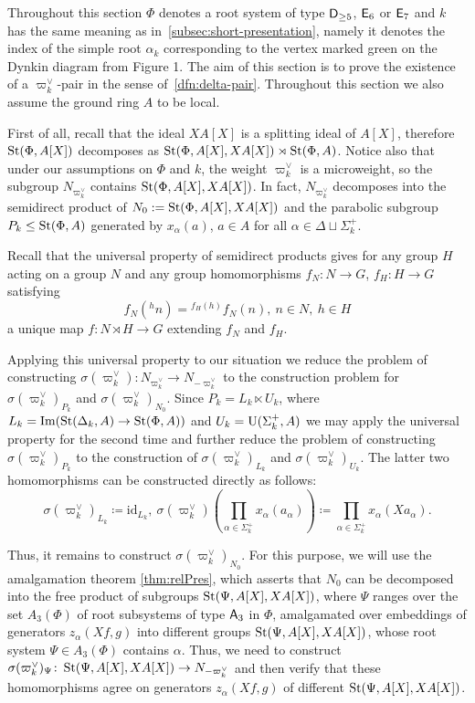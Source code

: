 Throughout this section $\Phi$ denotes a root system of type $\mathsf{D}_{\geq 5}$, $\mathsf{E}_6$ or $\mathsf{E}_7$ and
 $k$ has the same meaning as in~\cref{subsec:short-presentation}, namely
 it denotes the index of the simple root $\alpha_k$ corresponding to the vertex marked green on the Dynkin diagram from Figure 1.
The aim of this section is to prove the existence of a $\varpi_k^\vee$-pair in the sense of~\cref{dfn:delta-pair}.
Throughout this section we also assume the ground ring $A$ to be local.

First of all, recall that the ideal $XA[X]$ is a splitting ideal of $A[X]$, therefore
 $\operatorname{St}(\Phi, A[X])$ decomposes as $\operatorname{St}(\Phi, A[X], XA[X]) \rtimes \operatorname{St}(\Phi, A)$.
Notice also that under our assumptions on $\Phi$ and $k$, the weight $\varpi_k^\vee$ is a microweight, so the subgroup $N_{\varpi_k^\vee}$ contains $\operatorname{St}(\Phi, A[X], XA[X])$.
In fact, $N_{\varpi_k^\vee}$ decomposes into the semidirect product of $N_0 := \operatorname{St}(\Phi, A[X], XA[X])$ and the parabolic subgroup $P_k \leq \operatorname{St}(\Phi, A)$
 generated by $x_\alpha(a)$, $a \in A$ for all $\alpha \in \Delta \sqcup \Sigma^+_k$.

Recall that the universal property of semidirect products gives for any group $H$ acting on a group $N$
 and any group homomorphisms $f_N\colon N \to G$, $f_H\colon H \to G$ satisfying
\begin{equation}
    \label{eq:coherence-condition} f_N({}^hn) = {}^{f_H(h)} f_N(n),\ n\in N,\ h\in H
\end{equation}
a unique map $f\colon N \rtimes H \to G$ extending $f_N$ and $f_H$.

Applying this universal property to our situation we reduce the problem of constructing $\sigma(\varpi_k^\vee) \colon N_{\varpi_k^\vee} \to N_{-\varpi_k^\vee}$
 to the construction problem for $\sigma(\varpi_k^\vee)_{P_k}$ and $\sigma(\varpi_k^\vee)_{N_0}$.
Since $P_k = L_k \ltimes U_k$, where $L_k = \mathrm{Im}(\operatorname{St}(\Delta_k, A) \to \operatorname{St}(\Phi, A))$
and $U_k = \operatorname{U}(\Sigma_k^+, A)$ we may apply the universal property for the second time and further reduce the problem of constructing $\sigma(\varpi_k^\vee)_{P_k}$
 to the construction of $\sigma(\varpi_k^\vee)_{L_k}$ and $\sigma(\varpi_k^\vee)_{U_k}$.
The latter two homomorphisms can be constructed directly as follows:
\[\sigma(\varpi_k^\vee)_{L_k} \coloneqq \mathrm{id}_{L_k},\ \sigma(\varpi_k^\vee)\left(\prod\limits_{\alpha \in \Sigma_k^+} x_\alpha(a_\alpha)\right) \coloneqq \prod\limits_{\alpha \in \Sigma_k^+} x_\alpha(Xa_\alpha).\]

Thus, it remains to construct $\sigma({\varpi_k^\vee})_{N_0}$.
For this purpose, we will use the amalgamation theorem \cref{thm:relPres}, which asserts that $N_0$ can be decomposed into the free product of subgroups $\operatorname{St}(\Psi, A[X], XA[X])$,
 where $\Psi$ ranges over the set $A_3(\Phi)$ of root subsystems of type $\mathsf{A}_3$ in $\Phi$, amalgamated over embeddings of generators $z_\alpha(Xf, g)$ into different groups $\operatorname{St}(\Psi, A[X], XA[X])$, whose root system $\Psi \in A_3(\Phi)$ contains $\alpha$.
Thus, we need to construct $\sigma(\varpi_k^\vee)_\Psi \colon \operatorname{St}(\Psi, A[X], XA[X]) \to N_{-\varpi_k^\vee}$ and then
  verify that these homomorphisms agree on generators $z_\alpha(Xf, g)$ of different $\operatorname{St}(\Psi, A[X], XA[X])$.

